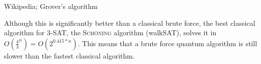 \documentclass[portrait,a0paper,fontscale=0.285]{baposter} %
\begin{document}
\begin{poster}
{\begin{center}
\begin{tiny}Wikipedia; Grover's algorithm\end{tiny}
\end{center}
\vspace{-0.5em}


Although this is significantly better than a classical brute force, the best classical algorithm for 3-SAT, the \textcolor{ourred}{\textsc{Sch\"{o}ning}} algorithm (walkSAT), solves it in $O(\frac{4}{3}^{n})=O(2^{0.415*n})$. This means that a brute force quantum algorithm is still slower than the fastest classical algorithm. 

}


\end{poster}
\end{document}
